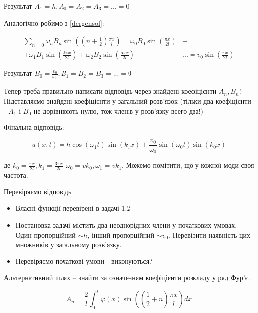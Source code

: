 \documentclass[a4paper, 14pt]{extreport}
\begin{document}
Результат $A_1 = h, A_0 = A_2 = A_3 = ... = 0$

Аналогічно робимо з \ref{dergensol}: 

\begin{equation}
    \begin{aligned}
        \sum_{n=0} \omega_n B_n \sin \left( (n + \frac{1}{2}) \frac{\pi x}{l} \right) = \omega_0 B_0 \sin \left(\frac{\pi x}{2 l} \right) &+\\
        + \omega_1 B_1 \sin \left(\frac{3 \pi x}{2 l} \right) + \omega_2 B_2 \sin \left(\frac{5 \pi x}{2 l} \right) + &... = v_0 \sin \left( \frac{\pi x}{2 l} \right)
    \end{aligned}
\end{equation}

Результат $B_0 = \frac{v_0}{\omega_0}, B_1 = B_2 = B_3 = ... = 0$

Тепер треба правильно написати відповідь через знайдені коефіцієнти $A_n, B_n$! Підставляємо знайдені коефіцієнти у загальний розв'язок (тільки два коефіцієнти - $A_1$ і $B_0$ не дорівнюють нулю, тож членів у розв'язку всего два!)

Фінальна відповідь:

\begin{equation}
    u (x,t) = h \cos (\omega_1 t) \sin (k_1 x) + \frac{v_0}{\omega_0} \sin (\omega_0 t) \sin (k_0 x)
\end{equation}

де $k_0 = \frac{\pi x}{2 l}, k_1 = \frac{3 \pi x}{2 l}, \omega_0 = v k_0, \omega_1 = v k_1 $. Можемо помітити, що у кожної моди своя частота.

Перевіряємо відповідь

\begin{itemize}
    \item Власні функції перевірені в задачі 1.2
    \item Постановка задачі містить два неоднорідних члени у початкових умовах. Один пропорційний $\sim h$, інший пропорційний $\sim v_0$. Перевірити наявність цих множників у загальному розв'язку.
    \item Перевіряємо початкові умови - виконуються?

\end{itemize}

Альтернативний шлях -- знайти за означенням коефіцієнти розкладу у ряд Фур'є.

\begin{equation}
A_n = \frac{2}{l} \int_{0}^{l} \varphi (x)  \sin \left( (\frac{1}{2} + n) \frac{\pi x}{l} \right) dx    
\end{equation}
\end{document}
